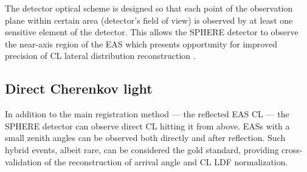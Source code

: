 \documentclass[a4paper,11pt]{article}
\begin{document}

The detector optical scheme is designed so that each point of the observation plane within certain area (detector's field of view) is observed by at least one sensitive element of the detector. This allows the SPHERE detector to observe the near-axis region of the EAS which presents opportunity for improved precision of CL lateral distribution reconstruction \cite{chu74:VKKL74, Anokhina2009}.


\subsection{Direct Cherenkov light}

In addition to the main registration method --- the reflected EAS CL --- the SPHERE detector can observe direct CL hitting it from above. EASs with a small zenith angles can be observed both directly and after reflection. Such hybrid events, albeit rare, can be considered the gold standard, providing cross-validation of the reconstruction of arrival angle and CL LDF normalization. 

\end{document}
